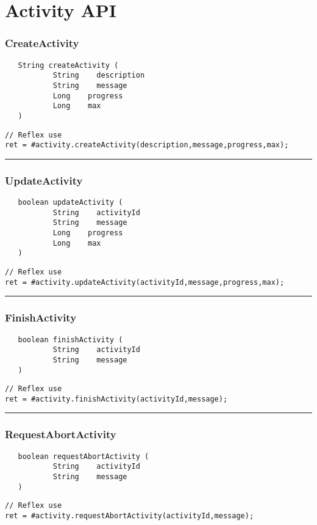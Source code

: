\section{Activity API}

\subsubsection{CreateActivity}
\label{Api:CreateActivity}
\begin{verbatim}
   String createActivity (
           String    description
           String    message
           Long    progress
           Long    max
   )
\end{verbatim}
\begin{lstlisting}[language=reflex]
// Reflex use
ret = #activity.createActivity(description,message,progress,max);
\end{lstlisting}



\rule{15cm}{2pt}
\subsubsection{UpdateActivity}
\label{Api:UpdateActivity}
\begin{verbatim}
   boolean updateActivity (
           String    activityId
           String    message
           Long    progress
           Long    max
   )
\end{verbatim}
\begin{lstlisting}[language=reflex]
// Reflex use
ret = #activity.updateActivity(activityId,message,progress,max);
\end{lstlisting}



\rule{15cm}{2pt}
\subsubsection{FinishActivity}
\label{Api:FinishActivity}
\begin{verbatim}
   boolean finishActivity (
           String    activityId
           String    message
   )
\end{verbatim}
\begin{lstlisting}[language=reflex]
// Reflex use
ret = #activity.finishActivity(activityId,message);
\end{lstlisting}



\rule{15cm}{2pt}
\subsubsection{RequestAbortActivity}
\label{Api:RequestAbortActivity}
\begin{verbatim}
   boolean requestAbortActivity (
           String    activityId
           String    message
   )
\end{verbatim}
\begin{lstlisting}[language=reflex]
// Reflex use
ret = #activity.requestAbortActivity(activityId,message);
\end{lstlisting}



